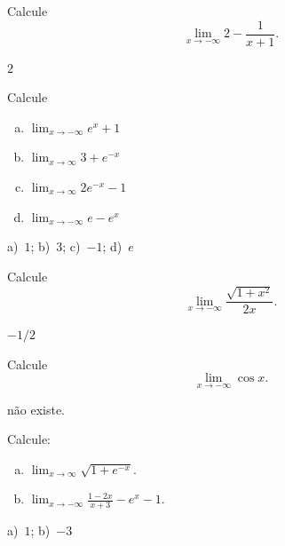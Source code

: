 \begin{exer}
  Calcule
  \begin{equation}
    \lim_{x\to -\infty} 2 - \frac{1}{x+1}.
  \end{equation}
\end{exer}
\begin{resp}
  $2$
\end{resp}

\begin{exer}
  Calcule
\end{exer}
\begin{enumerate}[a)]
\item $\displaystyle \lim_{x\to -\infty} e^x+1$
\item $\displaystyle \lim_{x\to \infty} 3 + e^{-x}$
\item $\displaystyle \lim_{x\to \infty} 2e^{-x}-1$
\item $\displaystyle \lim_{x\to -\infty} e-e^{x}$
\end{enumerate}
\begin{resp}
  a)~$1$; b)~$3$; c)~$-1$; d)~$e$
\end{resp}

\begin{exer}
  Calcule
  \begin{equation}
    \lim_{x\to -\infty} \frac{\sqrt{1+x^2}}{2x}.
  \end{equation}
\end{exer}
\begin{resp}
  $-1/2$
\end{resp}

\begin{exer}
  Calcule
  \begin{equation}
    \lim_{x\to -\infty} \cos x.
  \end{equation}
\end{exer}
\begin{resp}
  não existe.
\end{resp}

\begin{exer}
  Calcule:
  \begin{enumerate}[a)]
  \item $\displaystyle\lim_{x\to \infty} \sqrt{1+e^{-x}}$.
  \item $\displaystyle\lim_{x\to -\infty} \frac{1-2x}{x+3} -e^{x} - 1$.
  \end{enumerate}
\end{exer}
\begin{resp}
  a)~$1$; b)~$-3$
\end{resp}

